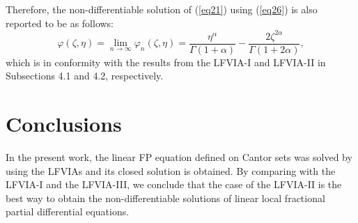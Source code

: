 \documentclass[10pt]{NSP1}
\begin{document}
Therefore, the non-differentiable solution of (\ref{eq21}) using (\ref{eq26}) is also
reported to be as follows:
\begin{equation}
\label{eq49}
\varphi \left( {\zeta ,\eta } \right)=\mathop {\lim }\limits_{n\to \infty }
\varphi _n \left( {\zeta ,\eta } \right)=\frac{\eta ^\alpha }{\Gamma \left(
{1+\alpha } \right)}-\frac{2\zeta ^{2\alpha }}{\Gamma \left( {1+2\alpha }
\right)},
\end{equation}
which is in conformity with the results from the LFVIA-I and LFVIA-II
in Subsections 4.1 and 4.2, respectively.\\

\vskip 2mm

\section{\; Conclusions}

In the present work, the linear FP equation defined on Cantor sets was
solved by using the LFVIAs and its closed solution is obtained. By comparing
with the LFVIA-I and the LFVIA-III, we conclude that the case of the LFVIA-II
is the best way to obtain the non-differentiable solutions of linear local fractional
partial differential equations.
\end{document}
